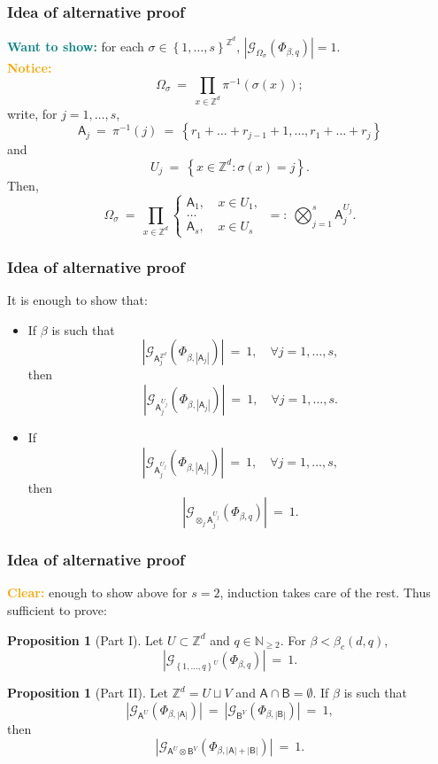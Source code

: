 \documentclass{beamer}
\renewcommand{\AA}{\mathsf{A}}
\newcommand{\AB}{\mathsf{B}}
\newcommand{\G}{\mathcal{G}}
\newcommand{\N}{\mathbb{N}}
\newcommand{\Z}{\mathbb{Z}}
\newcommand{\set}[1]{\left\{#1\right\}}
\newcommand{\1}{\mathbbm{1}}
\newcommand{\5}{\vspace{0.5cm}}
\newcommand{\3}{\vspace{0.3cm}}
\theoremstyle{definition}
\newtheorem{prop}[thm]{Proposition}
\begin{document}
\begin{frame}
\frametitle{Idea of alternative proof}
\textcolor{teal}{\textbf{Want to show:}} for each $\sigma\in\set{1,\ldots,s}^{\Z^d}$, $|\G_{\Omega_\sigma}(\Phi_{\beta,q})|=1$. \\\vspace{0.5cm}
\textcolor{orange}{\textbf{Notice:}} 
$$\Omega_\sigma ~=~ \prod_{x\in\Z^d}\pi^{-1}(\sigma(x));$$
write, for $j=1,\ldots,s$, 
$$\AA_j ~=~ \pi^{-1}(j) ~=~ \set{r_1+\ldots+r_{j-1}+1,\ldots,r_1+\ldots+r_j}$$
and
$$U_j ~=~ \set{x\in\Z^d:\sigma(x)=j}.$$
Then,
$$\Omega_\sigma ~=~ \prod_{x\in\Z^d}\begin{cases}
\AA_1, ~&x\in U_1, \\
\ldots \\
\AA_s, ~&x\in U_s
\end{cases} ~=:~ \bigotimes_{j=1}^s \AA_j^{U_j}.$$
\end{frame}

\begin{frame}
\frametitle{Idea of alternative proof}
It is enough to show that:\vspace{0.3cm}
\begin{itemize}
	\item[(i)] If $\beta$ is such that 
	$$|\G_{\AA_j^{\Z^d}}(\Phi_{\beta,|\AA_j|})| ~=~ 1, \quad \forall j=1,\ldots,s,$$
	then
	$$|\G_{\AA_j^{U_j}}(\Phi_{\beta,|\AA_j|})| ~=~ 1, \quad \forall j=1,\ldots,s.$$
	\item[(ii)] If 
	$$|\G_{\AA_j^{U_j}}(\Phi_{\beta,|\AA_j|})| ~=~ 1, \quad \forall j=1,\ldots,s,$$
	then
	$$|\G_{\otimes_j\AA_j^{U_j}}(\Phi_{\beta,q})| ~=~ 1.$$
\end{itemize}
\end{frame}

\begin{frame}
\frametitle{Idea of alternative proof}
\textcolor{orange}{\textbf{Clear:}} enough to show above for $s=2$, induction takes care of the rest. Thus sufficient to prove:
\begin{prop}[Part I]
Let $U\subset\Z^d$ and $q\in\N_{\geq 2}$. For $\beta<\beta_c(d,q)$,
$$|\G_{\set{1,\ldots,q}^U}(\Phi_{\beta,q})| ~=~ 1.$$
\end{prop}
\begin{prop}[Part II]
Let $\Z^d=U\sqcup V$ and $\AA\cap\AB=\emptyset$. If $\beta$ is such that
$$|\G_{\AA^U}(\Phi_{\beta,|\AA|})| ~=~ |\G_{\AB^V}(\Phi_{\beta,|\AB|})| ~=~ 1,$$
then
$$|\G_{\AA^U\otimes\AB^V}(\Phi_{\beta,|\AA|+|\AB|})| ~=~ 1.$$
\end{prop}
\end{frame}
\end{document}
